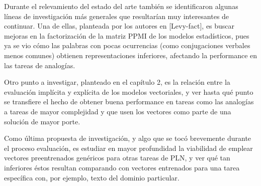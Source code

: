 Durante el relevamiento del estado del arte también se identificaron algunas líneas de investigación
más generales que resultarían muy interesantes de continuar. Una de ellas, planteada por los autores
en [Levy-fact], es buscar mejoras en la factorización de la matriz PPMI de los modelos estadísticos,
pues ya se vio cómo las palabras con pocas ocurrencias (como conjugaciones verbales menos comunes)
obtienen representaciones inferiores, afectando la performance en las tareas de analogías.

Otro punto a investigar, planteado en el capítulo 2, es la relación entre la evaluación implícita y
explícita de los modelos vectoriales, y ver hasta qué punto se transfiere el hecho de obtener buena
performance en tareas como las analogías a tareas de mayor complejidad y que usen los vectores como
parte de una solución de mayor porte.

Como última propuesta de investigación, y algo que se tocó brevemente durante el proceso evaluación,
es estudiar en mayor profundidad la viabilidad de emplear vectores preentrenados genéricos para
otras tareas de PLN, y ver qué tan inferiores éstos resultan comparando con vectores entrenados para
una tarea específica con, por ejemplo, texto del dominio particular.
